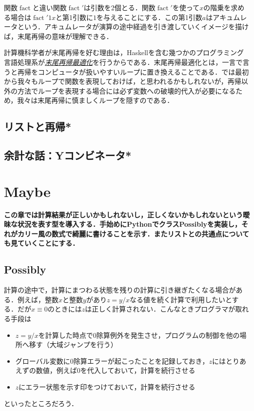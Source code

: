 \documentclass[a5paper,draft]{jsbook}
\newcommand{\programminglanguage}[1]{\textsf{#1}}
\newcommand{\haskell}{\programminglanguage{Haskell}}
\newcommand{\python}{\programminglanguage{Python}}
\newenvironment{leader}{\begingroup\bf}{\endgroup}
\newcommand{\keyword}[1]{{\underline{\emph{#1}}}}
\newcommand{\mathSpecialFunction}[1]{\operatorname{\mathrm{#1}}}
\newcommand{\mathFactorial}{\mathSpecialFunction{fact}}
\begin{document}
関数$\mathFactorial$と違い関数$\mathFactorial'$は引数を2個とる．関数$\mathFactorial'$を使って$x$の階乗を求める場合は$\mathFactorial'1x$と第1引数に$1$を与えることにする．この第1引数$a$はアキュムレータという．アキュムレータが演算の途中経過を引き渡していくイメージを描けば，末尾再帰の意味が理解できる．

計算機科学者が末尾再帰を好む理由は，\haskell を含む幾つかのプログラミング言語処理系が\keyword{末尾再帰最適化}を行うからである．末尾再帰最適化とは，一言で言うと再帰をコンピュータが扱いやすいループに置き換えることである．では最初から我々もループで関数を表現しておけば，と思われるかもしれないが，再帰以外の方法でループを表現する場合には必ず変数への破壊的代入が必要になるため，我々は末尾再帰に慎ましくループを隠すのである．

\section{リストと再帰*}

\section{余計な話：Yコンビネータ*}


\chapter{Maybe}

\begin{leader}
この章では計算結果が正しいかもしれないし，正しくないかもしれないという曖昧な状況を表す型を導入する．手始めに\python でクラスPossiblyを実装し，それがカリー風の数式で綺麗に書けることを示す．またリストとの共通点についても見ていくことにする．
\end{leader}

\section{Possibly}

計算の途中で，計算にまつわる状態を残りの計算に引き継ぎたくなる場合がある．例えば，整数$x$と整数$y$があり$z=y/x$なる値を続く計算で利用したいとする．だが$x\equiv0$のときには$z$は正しく計算されない．こんなときプログラマが取れる手段は
\begin{itemize}
\item $z=y/x$を計算した時点で$0$除算例外を発生させ，プログラムの制御を他の場所へ移す（大域ジャンプを行う）
\item グローバル変数に$0$除算エラーが起こったことを記録しておき，$z$にはとりあえずの数値，例えば$0$を代入しておいて，計算を続行させる
\item $z$にエラー状態を示す印をつけておいて，計算を続行させる
\end{itemize}
といったところだろう．
\end{document}
